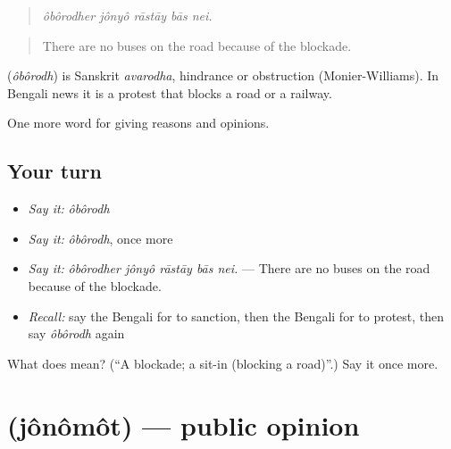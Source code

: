 \begin{quote}
    
\end{quote}

\begin{quote}
\emph{ôbôrodher jônyô rāstāy bās nei.}
\end{quote}

\begin{quote}
There are no buses on the road because of the blockade.
\end{quote}

\begin{cousinweb}
\textbf{} (\emph{ôbôrodh}) is Sanskrit \emph{avarodha}, hindrance or obstruction (Monier-Williams). In Bengali news it is a protest that blocks a road or a railway.
\end{cousinweb}

\begin{grammarlens}[title={What you've built}]
One more word for giving reasons and opinions.
\end{grammarlens}

\subsection*{Your turn}
\begin{itemize}
\raggedright
  \item \emph{Say it:} \emph{ôbôrodh}
  \item \emph{Say it:} \emph{ôbôrodh}, once more
  \item \emph{Say it:} \emph{ôbôrodher jônyô rāstāy bās nei.} — There are no buses on the road because of the blockade.
  \item \emph{Recall:} say the Bengali for to sanction, then the Bengali for to protest, then say \emph{ôbôrodh} again
\end{itemize}

\begin{tcolorbox}[breakable,colback=teal!4,colframe=teal!35!black,title={Before you move on}]
What does  mean? (\textquotedblleft{}A blockade; a sit-in (blocking a road)\textquotedblright{}.) Say it once more.
\end{tcolorbox}
\section[\texorpdfstring{\bn{জনমত} (jônômôt)}{জনমত (jônômôt)}]{ (jônômôt) — public opinion}

